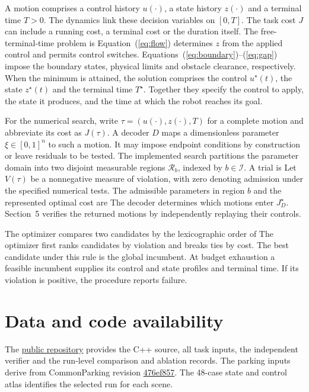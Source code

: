 \documentclass[a4paper]{cas-sc}
\begin{document}
A motion comprises a control history $u(\cdot)$, a state history $z(\cdot)$ and a terminal time $T>0$. The dynamics link these decision variables on $[0,T]$. The task cost $J$ can include a running cost, a terminal cost or the duration itself. The free-terminal-time problem is
Equation~(\ref{eq:flow}) determines $z$ from the applied control and permits control switches. Equations~(\ref{eq:boundary})--(\ref{eq:gap}) impose the boundary states, physical limits and obstacle clearance, respectively. When the minimum is attained, the solution comprises the control $u^\star(t)$, the state $z^\star(t)$ and the terminal time $T^\star$. Together they specify the control to apply, the state it produces, and the time at which the robot reaches its goal.

For the numerical search, write $\tau=(u(\cdot),z(\cdot),T)$ for a complete motion and abbreviate its cost as $J(\tau)$. A decoder $D$ maps a dimensionless parameter $\xi\in[0,1]^n$ to such a motion. It may impose endpoint conditions by construction or leave residuals to be tested. The implemented search partitions the parameter domain into two disjoint measurable regions $\mathcal R_b$, indexed by $b\in\mathcal I$. A trial is
Let $V(\tau)$ be a nonnegative measure of violation, with zero denoting admission under the specified numerical tests. The admissible parameters in region $b$ and the represented optimal cost are
The decoder determines which motions enter $J_D^\star$. Section~5 verifies the returned motions by independently replaying their controls.

The optimizer compares two candidates by the lexicographic order of
The optimizer first ranks candidates by violation and breaks ties by cost. The best candidate under this rule is the global incumbent. At budget exhaustion a feasible incumbent supplies its control and state profiles and terminal time. If its violation is positive, the procedure reports failure.



\section*{Data and code availability}
The \href{https://github.com/libai1943/eaai}{public repository} provides the C++ source, all task inputs, the independent verifier and the run-level comparison and ablation records. The parking inputs derive from CommonParking revision \href{https://github.com/libai1943/CommonParking/tree/476ef8573d9e22578be5c3d42514a9a29f27d07a}{476ef857}. The 48-case state and control atlas identifies the selected run for each scene.

\end{document}
